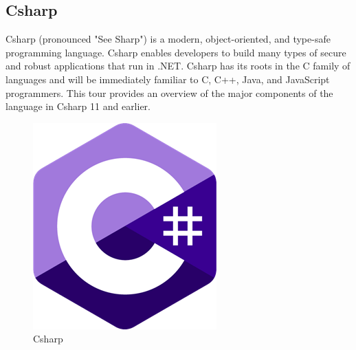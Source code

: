 \documentclass[12pt]{book}
\begin{document}
\subsection{Csharp}
Csharp (pronounced "See Sharp") is a modern, object-oriented, and type-safe programming language. Csharp enables developers to build many types of secure and robust applications that run in .NET. Csharp has its roots in the C family of languages and will be immediately familiar to C, C++, Java, and JavaScript programmers. This tour provides an overview of the major components of the language in Csharp 11 and earlier.
\begin{figure}[!h]
    \centering
    \includegraphics[scale=0.3]{./Figures/Images/csharp.png}
    \caption{Csharp}
    \label{Csharp}
\end{figure}

\newpage
\end{document}
